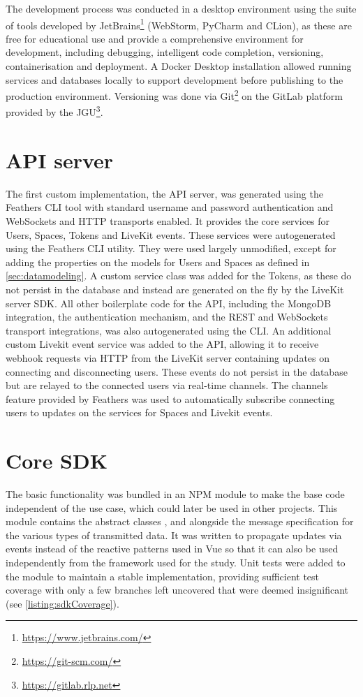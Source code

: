 The development process was conducted in a desktop environment using the suite of tools developed by JetBrains\footnote{\url{https://www.jetbrains.com/}} (WebStorm, PyCharm and CLion), as these are free for educational use and provide a comprehensive environment for development, including debugging, intelligent code completion, versioning, containerisation and deployment.
A Docker Desktop installation allowed running services and databases locally to support development before publishing to the production environment.
Versioning was done via Git\footnote{\url{https://git-scm.com/}} on the GitLab platform provided by the \ac{JGU}\footnote{\url{https://gitlab.rlp.net}}.

\section{API server}
\label{sec:api-server}

The first custom implementation, the \ac{API} server, was generated using the Feathers \ac{CLI} tool with standard username and password authentication and WebSockets and \ac{HTTP} transports enabled.
It provides the core services for Users, Spaces, Tokens and LiveKit events.
These services were autogenerated using the Feathers \ac{CLI} utility.
They were used largely unmodified, except for adding the properties on the models for Users and Spaces as defined in \autoref{sec:datamodeling}.
A custom service class was added for the Tokens, as these do not persist in the database and instead are generated on the fly by the LiveKit server \ac{SDK}.
All other boilerplate code for the \ac{API}, including the MongoDB integration, the authentication mechanism, and the REST and WebSockets transport integrations, was also autogenerated using the \ac{CLI}.
An additional custom Livekit event service was added to the API, allowing it to receive webhook requests via \ac{HTTP} from the LiveKit server containing updates on connecting and disconnecting users.
These events do not persist in the database but are relayed to the connected users via real-time channels.
The channels feature provided by Feathers was used to automatically subscribe connecting users to updates on the services for Spaces and Livekit events.

\section{Core SDK}
\label{sec:core-sdk}

The basic functionality was bundled in an \ac{NPM} module to make the base code independent of the use case, which could later be used in other projects.
This module contains the abstract classes ,  and  alongside the message specification for the various types of transmitted data.
It was written to propagate updates via events instead of the reactive patterns used in Vue so that it can also be used independently from the framework used for the study.
Unit tests were added to the module to maintain a stable implementation, providing sufficient test coverage with only a few branches left uncovered that were deemed insignificant (see \autoref{listing:sdkCoverage}).

